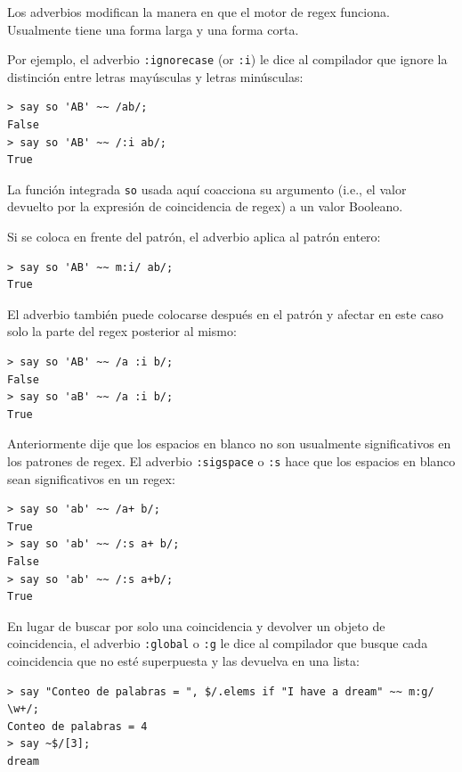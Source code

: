 Los adverbios modifican la manera en que el motor de regex funciona.
Usualmente tiene una forma larga y una forma corta.

Por ejemplo, el adverbio \verb|:ignorecase| (or \verb|:i|)
le dice al compilador que ignore la distinción entre letras
mayúsculas y letras minúsculas: 

\begin{lstlisting}
> say so 'AB' ~~ /ab/;
False
> say so 'AB' ~~ /:i ab/;
True
\end{lstlisting}
%

La función integrada \verb|so| usada aquí coacciona su argumento 
(i.e., el valor devuelto por la expresión de coincidencia de regex)
a un valor Booleano.

Si se coloca en frente del patrón, el adverbio aplica al patrón
entero:

\begin{lstlisting}
> say so 'AB' ~~ m:i/ ab/;
True
\end{lstlisting}
%

El adverbio también puede colocarse después en el patrón y afectar
en este caso solo la parte del regex posterior al mismo:

\begin{lstlisting}
> say so 'AB' ~~ /a :i b/;
False
> say so 'aB' ~~ /a :i b/;
True
\end{lstlisting}
%

Anteriormente dije que los espacios en blanco no son usualmente
significativos en los patrones de regex. El adverbio \verb|:sigspace|
o \verb|:s| hace que los espacios en blanco sean significativos en 
un regex:

\begin{lstlisting}
> say so 'ab' ~~ /a+ b/;
True
> say so 'ab' ~~ /:s a+ b/;
False
> say so 'ab' ~~ /:s a+b/;
True
\end{lstlisting}
%

En lugar de buscar por solo una coincidencia y devolver
un objeto de coincidencia, el adverbio \verb|:global| 
o \verb|:g| le dice al compilador que busque cada
coincidencia que no esté superpuesta y las devuelva
en una lista:

\begin{lstlisting}
> say "Conteo de palabras = ", $/.elems if "I have a dream" ~~ m:g/ \w+/;
Conteo de palabras = 4
> say ~$/[3];
dream
\end{lstlisting}
%

